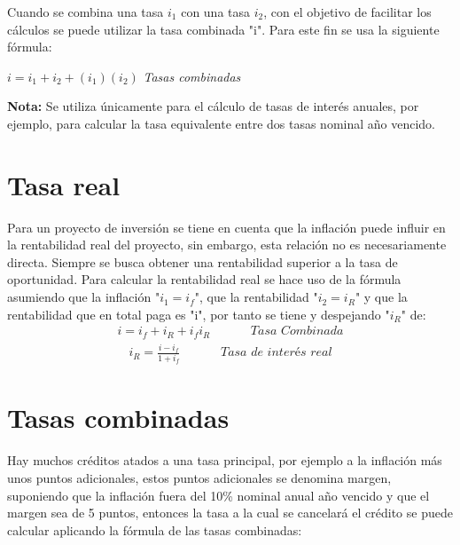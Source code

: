 Cuando se combina una tasa $i_{1}$ con una tasa $i_{2}$, con el objetivo de facilitar los cálculos se puede utilizar la tasa combinada "i". Para este fin se usa la siguiente fórmula:\\
\centerline{$ i = i_{1} +i_{2} + (i_{1})( i_{2})$ \hspace{15pt}\textit{ Tasas combinadas}\\}
\textbf{Nota:} Se utiliza únicamente para el cálculo de tasas de interés anuales, por ejemplo, para calcular la tasa equivalente entre dos tasas nominal año vencido.\\






\section{Tasa real}
Para un proyecto de inversión se tiene en cuenta que la inflación puede influir en la rentabilidad real del proyecto, sin embargo, esta relación no es necesariamente directa. Siempre se busca obtener una rentabilidad superior a la tasa de oportunidad. Para calcular la rentabilidad real se hace uso de la fórmula asumiendo que la inflación "$i_{1} = i_ {f} $", que la rentabilidad "$i_{2} = i_ {R} $" y que la rentabilidad que en total paga es "i", por tanto se tiene y despejando "$i_{R}$" de:
\begin{align*}
 i= i_{f} + i_{R} + i_{f} i_{R}\hspace{35pt}\textit{ Tasa Combinada}
\end{align*}
\begin{align*}
 i_{R} = \frac{i-i_{f}}{1+i_{f}}\hspace{35pt}\textit{ Tasa de interés real}
\end{align*}







\section{Tasas combinadas}
Hay muchos créditos atados a una tasa principal, por ejemplo a la inflación más unos puntos adicionales, estos puntos adicionales se denomina margen, suponiendo que la inflación fuera del 10\% nominal anual año vencido y que el margen sea de 5 puntos, entonces la tasa a la cual se cancelará el crédito se puede calcular aplicando la fórmula de las tasas combinadas: \\

